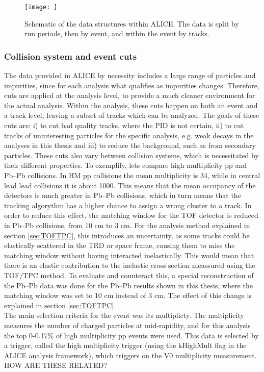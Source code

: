 \begin{figure}
	\texttt{[image: ]}
	\centering
	\caption{Schematic of the data structures within ALICE. The data is split by run periods, then by event, and within the event by tracks. }
		\label{fig:ALICE_data_schematic}
\end{figure}
\subsubsection{Collision system and event cuts}
The data provided in ALICE by necessity includes a large range of particles and impurities, since for each analysis what qualifies as impurities changes. Therefore, cuts are applied at the analysis level, to provide a much cleaner environment for the actual analysis. Within the analysis, these cuts happen on both an event and a track level, leaving a subset of tracks which can be analyzed. The goals of these cuts are: i) to cut bad quality tracks, where the PID is not certain, ii) to cut tracks of uninteresting particles for the specific analysis, e.g. weak decays in the analyses in this thesis and iii) to reduce the background, such as from secondary particles. These cuts also vary between collision systems, which is necessitated by their different properties. To exemplify, lets compare high multiplicity pp and Pb--Pb collisions. In HM pp collisions the mean multiplicity is 34, while in central lead lead collisions it is about 1000. This means that the mean occupancy of the detectors is much greater in Pb--Pb collisions, which in turn means that the tracking algorythm has a higher chance to assign a wrong cluster to a track. In order to reduce this effect, the matching window for the TOF detector is reduced in Pb--Pb collisions, from 10 cm to 3 cm. For the analysis method explained in section \ref{sec:TOFTPC}, this introduces an uncertainty, as some tracks could be elastically scattered in the TRD or space frame, causing them to miss the matching window without having interacted inelastically. This would mean that there is an elastic contribution to the inelastic cross section meassured using the TOF/TPC method. To evaluate and counteract this, a special reconstruction of the Pb--Pb data was done for the Pb--Pb results shown in this thesis, where the matching window was set to 10 cm instead of 3 cm. The effect of this change is explained in section \ref{sec:TOFTPC}. \\

The main selection criteria for the event was its multiplicty. The multiplicity measures the number of charged particles at mid-rapidity, and for this analysis the top 0-0.17\% of high multiplicity pp events were used. This data is selected by a trigger, called the high multiplicity trigger (using the kHighMult flag in the ALICE analysis framework), which triggers on the V0 multiplicity measurement. HOW ARE THESE RELATED? 

